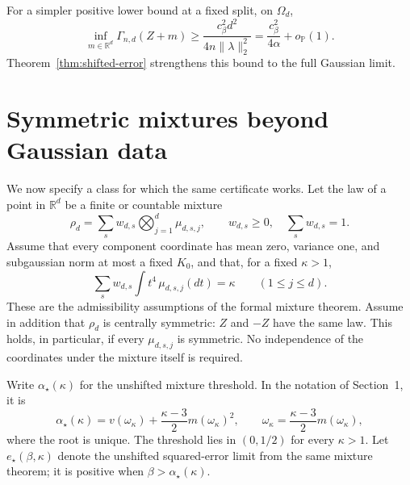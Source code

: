 \documentclass[11pt]{article}
\newcommand{\R}{\mathbb R}
\newcommand{\Pbb}{\mathbb P}
\newcommand{\norm}[1]{\lVert#1\rVert}
\newcommand{\oP}{o_{\Pbb}}
\theoremstyle{remark}
\begin{document}
For a simpler positive lower bound at a fixed split, on $\Omega_d$,
\[
 \inf_{m\in\R^d}\Gamma_{n,d}(Z+m)
 \ge\frac{c_\beta^2d^2}{4n\norm\lambda_2^2}
 =\frac{c_\beta^2}{4\alpha}+\oP(1).
\]
Theorem~\ref{thm:shifted-error} strengthens this bound to the full
Gaussian limit.

\section{Symmetric mixtures beyond Gaussian data}
\label{sec:symmetric-mixtures}

We now specify a class for which the same certificate works. Let the
law of a point in $\R^d$ be a finite or countable mixture
\begin{equation}\label{eq:symmetric-mixture-law}
 \rho_d=\sum_s w_{d,s}\bigotimes_{j=1}^d\mu_{d,s,j},\qquad
 w_{d,s}\ge0,\quad\sum_s w_{d,s}=1.
\end{equation}
Assume that every component coordinate has mean zero, variance one,
and subgaussian norm at most a fixed $K_0$, and that, for a fixed
$\kappa>1$,
\begin{equation}\label{eq:mixture-fourth}
 \sum_s w_{d,s}\int t^4\,\mu_{d,s,j}(dt)=\kappa
       \qquad(1\le j\le d).
\end{equation}
These are the admissibility assumptions of the formal mixture theorem.
Assume in addition that $\rho_d$ is centrally symmetric: $Z$ and $-Z$
have the same law. This holds, in particular, if every
$\mu_{d,s,j}$ is symmetric. No independence of the coordinates under
the mixture itself is required.

Write $\alpha_\star(\kappa)$ for the unshifted mixture threshold. In
the notation of Section~1, it is
\[
 \alpha_\star(\kappa)
   =v(\omega_\kappa)+\frac{\kappa-3}{2}m(\omega_\kappa)^2,
 \qquad \omega_\kappa=\frac{\kappa-3}{2}m(\omega_\kappa),
\]
where the root is unique. The threshold lies in $(0,1/2)$ for every
$\kappa>1$.
Let $e_\star(\beta,\kappa)$ denote the unshifted squared-error limit
from the same mixture theorem; it is positive when
$\beta>\alpha_\star(\kappa)$.
\end{document}
